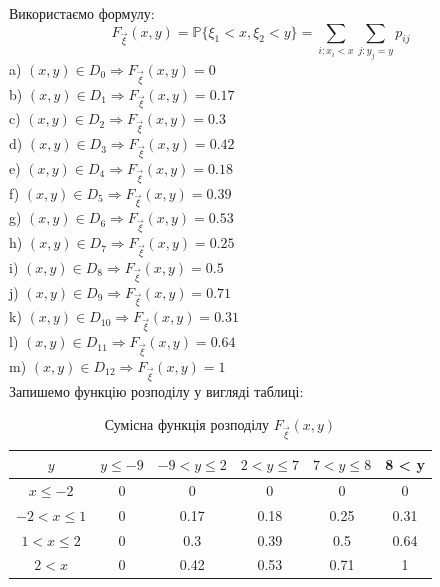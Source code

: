 \documentclass[14pt, a4paper, ukrainian]{extreport}
\begin{document}
	Використаємо формулу:
	$$ F_{\vec \xi }(x, y) = \mathbb{P} \{\xi_1 < x, \xi_2 < y\} = \sum_{i:x_i < x} \sum_{j:y_j = y} p_{ij}$$
	a) $(x, y) \in D_0 \Rightarrow F_{\vec \xi}(x, y) = 0$\\
	b) $(x, y) \in D_1 \Rightarrow F_{\vec \xi}(x, y) = 0.17$\\
	c) $(x, y) \in D_2 \Rightarrow F_{\vec \xi}(x, y) = 0.3$\\
	d) $(x, y) \in D_3 \Rightarrow F_{\vec \xi}(x, y) = 0.42$\\
	e) $(x, y) \in D_4 \Rightarrow F_{\vec \xi}(x, y) = 0.18$\\
	f) $(x, y) \in D_5 \Rightarrow F_{\vec \xi}(x, y) = 0.39$\\
	g) $(x, y) \in D_6 \Rightarrow F_{\vec \xi}(x, y) = 0.53$\\
	h) $(x, y) \in D_7 \Rightarrow F_{\vec \xi}(x, y) = 0.25$\\
	i) $(x, y) \in D_8 \Rightarrow F_{\vec \xi}(x, y) = 0.5$\\
	j) $(x, y) \in D_9 \Rightarrow F_{\vec \xi}(x, y) = 0.71$\\
	k) $(x, y) \in D_10 \Rightarrow F_{\vec \xi}(x, y) = 0.31$\\
	l) $(x, y) \in D_11 \Rightarrow F_{\vec \xi}(x, y) = 0.64$\\
	m) $(x, y) \in D_12 \Rightarrow F_{\vec \xi}(x, y) = 1$\\
	
	Запишемо функцію розподілу у вигляді таблиці:
	
	\begin{table}[H]
		\caption{\label{tab:Fxy}Сумісна функція розподілу $F_{\vec \xi}(x, y)$}
		\begin{center}
			\begin{tabular}{| c | c | c | c | c | c |}
				\hline
				\backslashbox{$x$} {$y$} & $y \le -9$ & $ -9 < y \le 2$ & $ 2 < y \le 7 $& $ 7 < y \le 8 $ & 8 < y\\
				\hline
				$ x \le -2 $ & 0 & 0 & 0 & 0 & 0\\
				\hline
				$ -2 < x \le 1 $ & 0 & 0.17 & 0.18 & 0.25 & 0.31 \\
				\hline
				$ 1 < x \le 2 $ & 0 & 0.3 & 0.39 &  0.5 & 0.64\\
				\hline
				$ 2 < x $ & 0 & 0.42 & 0.53 & 0.71 & 1\\
				\hline
				
			\end{tabular}
		\end{center}
	\end{table}
\end{document}
